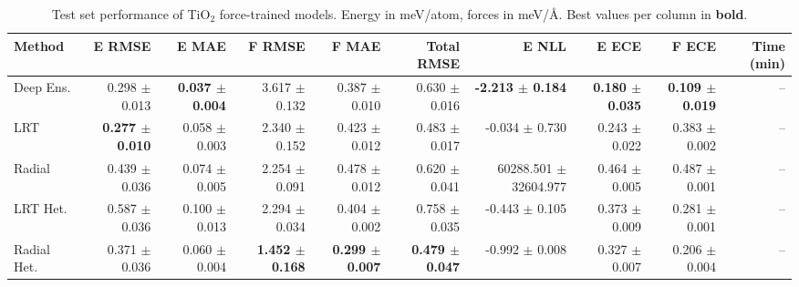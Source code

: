 \begin{table}
\centering
\caption{Test set performance of TiO$_2$ force-trained models. Energy in meV/atom, forces in meV/\AA{}. Best values per column in \textbf{bold}.}
\label{tab:tio2_results}
\begin{tabular}{lrrrrrrrrr}
\toprule
Method & E RMSE & E MAE & F RMSE & F MAE & Total RMSE & E NLL & E ECE & F ECE & Time (min) \\
\midrule
Deep Ens. & 0.298 $\pm$ 0.013 & \textbf{0.037 $\pm$ 0.004} & 3.617 $\pm$ 0.132 & 0.387 $\pm$ 0.010 & 0.630 $\pm$ 0.016 & \textbf{-2.213 $\pm$ 0.184} & \textbf{0.180 $\pm$ 0.035} & \textbf{0.109 $\pm$ 0.019} & -- \\
LRT & \textbf{0.277 $\pm$ 0.010} & 0.058 $\pm$ 0.003 & 2.340 $\pm$ 0.152 & 0.423 $\pm$ 0.012 & 0.483 $\pm$ 0.017 & -0.034 $\pm$ 0.730 & 0.243 $\pm$ 0.022 & 0.383 $\pm$ 0.002 & -- \\
Radial & 0.439 $\pm$ 0.036 & 0.074 $\pm$ 0.005 & 2.254 $\pm$ 0.091 & 0.478 $\pm$ 0.012 & 0.620 $\pm$ 0.041 & 60288.501 $\pm$ 32604.977 & 0.464 $\pm$ 0.005 & 0.487 $\pm$ 0.001 & -- \\
LRT Het. & 0.587 $\pm$ 0.036 & 0.100 $\pm$ 0.013 & 2.294 $\pm$ 0.034 & 0.404 $\pm$ 0.002 & 0.758 $\pm$ 0.035 & -0.443 $\pm$ 0.105 & 0.373 $\pm$ 0.009 & 0.281 $\pm$ 0.001 & -- \\
Radial Het. & 0.371 $\pm$ 0.036 & 0.060 $\pm$ 0.004 & \textbf{1.452 $\pm$ 0.168} & \textbf{0.299 $\pm$ 0.007} & \textbf{0.479 $\pm$ 0.047} & -0.992 $\pm$ 0.008 & 0.327 $\pm$ 0.007 & 0.206 $\pm$ 0.004 & -- \\
\bottomrule
\end{tabular}
\end{table}
